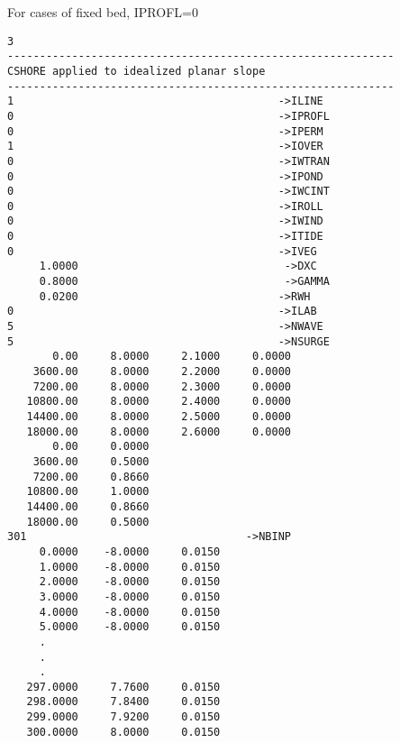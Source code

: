 \documentclass[11pt,oneside]{book}
\begin{document}
For cases of fixed bed, IPROFL=0
\begin{verbatim}
3 
------------------------------------------------------------ 
CSHORE applied to idealized planar slope 
------------------------------------------------------------ 
1                                         ->ILINE
0                                         ->IPROFL
0                                         ->IPERM
1                                         ->IOVER
0                                         ->IWTRAN
0                                         ->IPOND
0                                         ->IWCINT
0                                         ->IROLL 
0                                         ->IWIND 
0                                         ->ITIDE 
0                                         ->IVEG 
     1.0000                                ->DXC
     0.8000                                ->GAMMA 
     0.0200                               ->RWH 
0                                         ->ILAB
5                                         ->NWAVE 
5                                         ->NSURGE 
       0.00     8.0000     2.1000     0.0000
    3600.00     8.0000     2.2000     0.0000
    7200.00     8.0000     2.3000     0.0000
   10800.00     8.0000     2.4000     0.0000
   14400.00     8.0000     2.5000     0.0000
   18000.00     8.0000     2.6000     0.0000
       0.00     0.0000
    3600.00     0.5000
    7200.00     0.8660
   10800.00     1.0000
   14400.00     0.8660
   18000.00     0.5000
301                                  ->NBINP 
     0.0000    -8.0000     0.0150
     1.0000    -8.0000     0.0150
     2.0000    -8.0000     0.0150
     3.0000    -8.0000     0.0150
     4.0000    -8.0000     0.0150
     5.0000    -8.0000     0.0150
     .
     .
     .
   297.0000     7.7600     0.0150
   298.0000     7.8400     0.0150
   299.0000     7.9200     0.0150
   300.0000     8.0000     0.0150

\end{verbatim}
\end{document}
